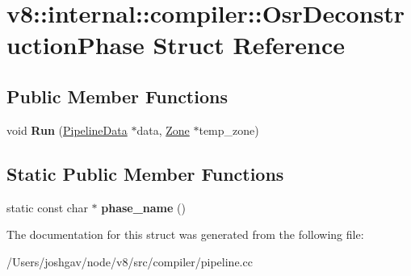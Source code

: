 \hypertarget{structv8_1_1internal_1_1compiler_1_1_osr_deconstruction_phase}{}\section{v8\+:\+:internal\+:\+:compiler\+:\+:Osr\+Deconstruction\+Phase Struct Reference}
\label{structv8_1_1internal_1_1compiler_1_1_osr_deconstruction_phase}
\subsection*{Public Member Functions}
\begin{DoxyCompactItemize}
\item 
void {\bfseries Run} (\hyperlink{classv8_1_1internal_1_1compiler_1_1_pipeline_data}{Pipeline\+Data} $\ast$data, \hyperlink{classv8_1_1internal_1_1_zone}{Zone} $\ast$temp\+\_\+zone)\hypertarget{structv8_1_1internal_1_1compiler_1_1_osr_deconstruction_phase_a6406d3eccf3bd79fca32f300b9cc4fc3}{}\label{structv8_1_1internal_1_1compiler_1_1_osr_deconstruction_phase_a6406d3eccf3bd79fca32f300b9cc4fc3}

\end{DoxyCompactItemize}
\subsection*{Static Public Member Functions}
\begin{DoxyCompactItemize}
\item 
static const char $\ast$ {\bfseries phase\+\_\+name} ()\hypertarget{structv8_1_1internal_1_1compiler_1_1_osr_deconstruction_phase_a4d22fe2608d449d6054616f5d0df1f58}{}\label{structv8_1_1internal_1_1compiler_1_1_osr_deconstruction_phase_a4d22fe2608d449d6054616f5d0df1f58}

\end{DoxyCompactItemize}


The documentation for this struct was generated from the following file\+:\begin{DoxyCompactItemize}
\item 
/\+Users/joshgav/node/v8/src/compiler/pipeline.\+cc\end{DoxyCompactItemize}
